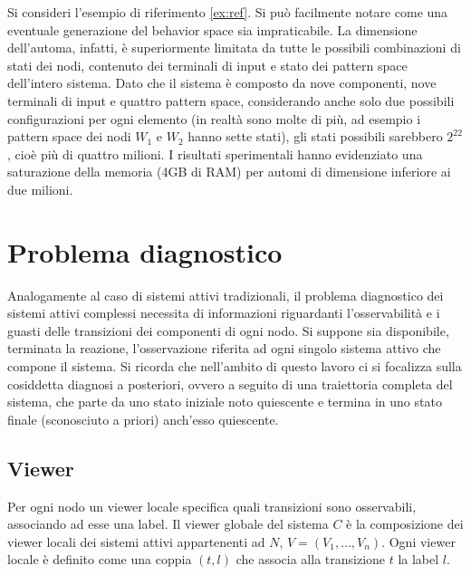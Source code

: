 \begin{ex}
Si consideri l'esempio di riferimento \ref{ex:ref}. Si può facilmente notare come una eventuale generazione del behavior space sia impraticabile. La dimensione dell'automa, infatti, è superiormente limitata da tutte le possibili combinazioni di stati dei nodi, contenuto dei terminali di input e stato dei pattern space dell'intero sistema. Dato che il sistema è composto da nove componenti, nove terminali di input e quattro pattern space, considerando anche solo due possibili configurazioni per ogni elemento (in realtà sono molte di più, ad esempio i pattern space dei nodi $W_1$ e $W_2$ hanno sette stati), gli stati possibili sarebbero $2^{22}$, cioè più di quattro milioni. I risultati sperimentali hanno evidenziato una saturazione della memoria (4GB di RAM) per automi di dimensione inferiore ai due milioni.
\end{ex}


\newpage
\section{Problema diagnostico}
Analogamente al caso di sistemi attivi tradizionali, il problema diagnostico dei sistemi attivi complessi necessita di informazioni riguardanti l'osservabilità e i guasti delle transizioni dei componenti di ogni nodo. Si suppone sia disponibile, terminata la reazione, l'osservazione riferita ad ogni singolo sistema attivo che compone il sistema. Si ricorda che nell'ambito di questo lavoro ci si focalizza sulla cosiddetta diagnosi a posteriori, ovvero a seguito di una traiettoria completa del sistema, che parte da uno stato iniziale noto quiescente e termina in uno stato finale (sconosciuto a priori) anch'esso quiescente. 

\subsection{Viewer}
Per ogni nodo un viewer locale specifica quali transizioni sono osservabili, associando ad esse una label. Il viewer globale del sistema $C$ è la composizione dei viewer locali dei sistemi attivi appartenenti ad $N$, $V = (V_1, \ldots, V_n)$. Ogni viewer locale è definito come una coppia $(t,l)$ che associa alla transizione $t$ la label $l$.

